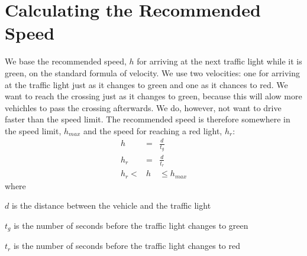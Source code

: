 \section{Calculating the Recommended Speed}

We base the recommended speed, $h$ for arriving at the next traffic light while it is green, on the standard formula of velocity.
We use two velocities: one for arriving at the traffic light just as it changes to green and one as it chances to red.
We want to reach the crossing just as it changes to green, because this will alow more vehichles to pass the crossing afterwards.
We do, however, not want to drive faster than the speed limit.
The recommended speed is therefore somewhere in the speed limit, $h_{max}$ and the speed for reaching a red light, $h_r$:
\begin{eqnarray}
h &=& \frac{d}{t_g}\label{eq:Math:h}\\
h_r &=& \frac{d}{t_r}\nonumber\\
h_r < &h& \leq h_{max}\label{eq:Math:recSpeed}
\end{eqnarray}
where
\vspace{-5mm}
\begin{itemize*}
\item $d$ is the distance between the vehicle and the traffic light
\item $t_g$ is the number of seconds before the traffic light changes to green
\item $t_r$ is the number of seconds before the traffic light changes to red
\end{itemize*}

